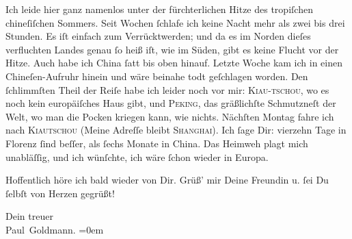 \pstart
           Ich leide hier ganz namenlos unter der fürchterlichen Hitze des tropiſchen chineſiſchen Sommers. Seit
               Wochen ſchlafe {\pb}ich keine Nacht mehr als zwei bis
               drei Stunden. Es iſt einfach zum Verrücktwerden; und da es im Norden dieſes
               verfluchten Landes genau ſo
               heiß iſt, wie im Süden, gibt es keine Flucht vor der Hitze. Auch habe ich China ſatt bis oben hinauf. Letzte Woche kam ich
               in einen Chineſen-Aufruhr
               hinein und wäre beinahe todt geſchlagen worden. Den ſchlimmſten Theil der Reiſe habe
               ich leider noch vor mir: \textsc{Kiau-tschou}, wo es noch kein europäiſches Haus gibt, und \textsc{Peking}, das gräßlichſte Schmutzneſt der {\pb}Welt, wo man
               die Pocken kriegen kann, wie nichts. Nächſten Montag
               fahre ich nach \textsc{Kiautschou} (Meine Adreſſe bleibt \textsc{Shanghai}). Ich ſage Dir: vierzehn Tage in Florenz
               ſind beſſer, als ſechs Monate in China. Das
               Heimweh plagt mich unabläſſig, und ich wünſchte, ich wäre ſchon wieder in Europa.\pend
           
\pstart
           Hoffentlich höre ich bald wieder von Dir. Grüß’ mir Deine Freundin u. ſei Du ſelbſt von Herzen
               gegrüßt!\pend
           
\pstart
           Dein treuer {\\[\baselineskip]}\spacefill\mbox{Paul Goldmann.}\pend
           \leftskip=0em{}\endnumbering{}  
      